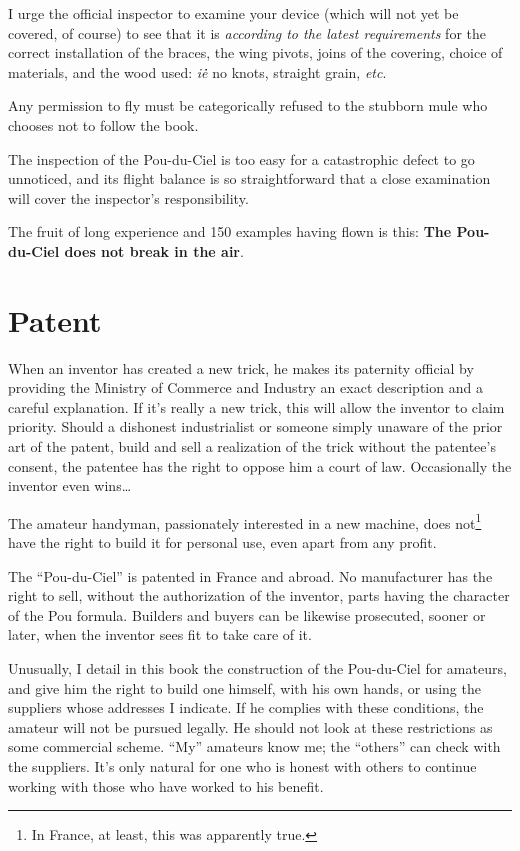 \documentclass{book}
\begin{document}
I urge the official inspector to examine your device (which will not
yet be covered, of course) to see that it is \emph{according to the
  latest requirements} for the correct installation of the braces, the
wing pivots, joins of the covering, choice of materials, and the wood
used: \textit{i\.e\.} no knots, straight grain, \textit{etc}.

Any permission to fly must be categorically refused to the stubborn
mule who chooses not to follow the book.

The inspection of the Pou-du-Ciel is too easy for a catastrophic
defect to go unnoticed, and its flight balance is so straightforward
that a close examination will cover the inspector's responsibility.

The fruit of long experience and 150 examples having flown is this:
\textbf{The Pou-du-Ciel does not break in the air}.

\section{Patent}

When an inventor has created a new trick, he makes its paternity
official by providing the Ministry of Commerce and Industry an exact
description and a careful explanation. If it's really a new trick,
this will allow the inventor to claim priority. Should a dishonest
industrialist or someone simply unaware of the prior art of the
patent, build and sell a realization of the trick without the
patentee's consent, the patentee has the right to oppose him a court
of law. Occasionally the inventor even wins\ldots

The amateur handyman, passionately interested in a new machine, does
not\footnote{In France, at least, this was apparently true.} have the
right to build it for personal use, even apart from any profit.

The ``Pou-du-Ciel'' is patented in France and abroad. No manufacturer
has the right to sell, without the authorization of the inventor,
parts having the character of the Pou formula. Builders and buyers can
be likewise prosecuted, sooner or later, when the inventor sees fit to
take care of it.

Unusually, I detail in this book the construction of the Pou-du-Ciel
for amateurs, and give him the right to build one himself, with his
own hands, or using the suppliers whose addresses I indicate. If he
complies with these conditions, the amateur will not be pursued
legally. He should not look at these restrictions as some commercial
scheme. ``My'' amateurs know me; the ``others'' can check with the
suppliers. It's only natural for one who is honest with others to
continue working with those who have worked to his benefit.
\end{document}
